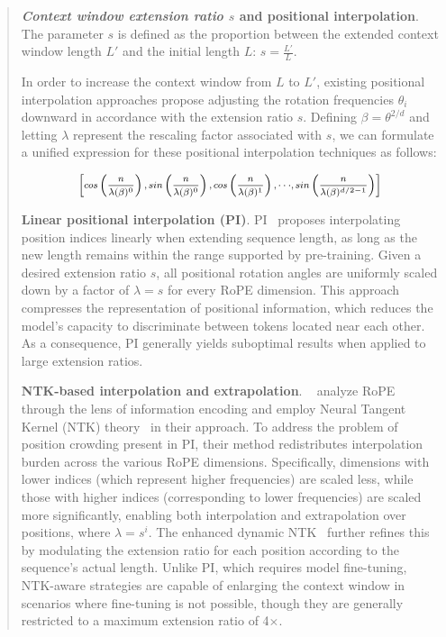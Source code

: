 \begin{abstract}
\textbf{\emph{Context window extension ratio $s$} and positional interpolation}. The parameter $s$ is defined as the proportion between the extended context window length $L'$ and the initial length $L$: $s=\frac{L'}{L}$.

In order to increase the context window from $L$ to $L'$, existing positional interpolation approaches propose adjusting the rotation frequencies $\theta_i$ downward in accordance with the extension ratio $s$. Defining $\beta = \theta^{2/d}$ and letting $\lambda$ represent the rescaling factor associated with $s$, we can formulate a unified expression for these positional interpolation techniques as follows:

\begin{equation}	
	\fontsize{7.5}{7.5} \selectfont
	\label{eq:unified_rope}
	\begin{aligned}
		\left[cos\left(\frac{n}{\lambda(\beta)^0}\right), sin \left(\frac{n}{\lambda(\beta)^0}\right), cos\left(\frac{n}{\lambda(\beta)^1}\right), \cdot\cdot\cdot,  sin \left(\frac{n}{\lambda(\beta)^{d/2-1}}\right) \right]   
	\end{aligned}
\end{equation}

\textbf{Linear positional interpolation (PI)}. PI~\cite{pi} proposes interpolating position indices linearly when extending sequence length, as long as the new length remains within the range supported by pre-training. Given a desired extension ratio $s$, all positional rotation angles are uniformly scaled down by a factor of $\lambda = s$ for every RoPE dimension. This approach compresses the representation of positional information, which reduces the model's capacity to discriminate between tokens located near each other. As a consequence, PI generally yields suboptimal results when applied to large extension ratios.

\textbf{NTK-based interpolation and extrapolation}. ~\cite{ntk,dynamicntk} analyze RoPE through the lens of information encoding and employ Neural Tangent Kernel (NTK) theory~\cite{jacot2018neural,tancik2020fourier} in their approach. To address the problem of position crowding present in PI, their method redistributes interpolation burden across the various RoPE dimensions. Specifically, dimensions with lower indices (which represent higher frequencies) are scaled less, while those with higher indices (corresponding to lower frequencies) are scaled more significantly, enabling both interpolation and extrapolation over positions, where $\lambda=s^{i}$. The enhanced dynamic NTK~\cite{dynamicntk} further refines this by modulating the extension ratio for each position according to the sequence's actual length. Unlike PI, which requires model fine-tuning, NTK-aware strategies are capable of enlarging the context window in scenarios where fine-tuning is not possible, though they are generally restricted to a maximum extension ratio of 4$\times$.


\end{abstract}
